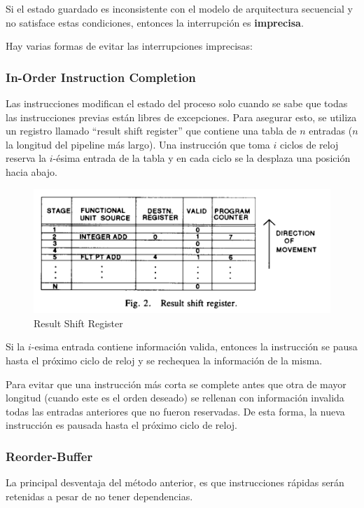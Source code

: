 Si el estado guardado es inconsistente con el modelo de arquitectura secuencial y no satisface estas condiciones, entonces la interrupción es \textbf{imprecisa}. 

Hay varias formas de evitar las interrupciones imprecisas:

\subsubsection{In-Order Instruction Completion}
Las instrucciones modifican el estado del proceso solo cuando se sabe que todas las instrucciones previas están libres de excepciones. Para asegurar esto, se utiliza un registro llamado ``result shift register'' que contiene una tabla de $n$  entradas ($n$ la longitud del pipeline más largo). Una instrucción que toma $i$ ciclos de reloj reserva la $i$-ésima entrada de la tabla y en cada ciclo se la desplaza una posición hacia abajo.
\begin{figure}[h]
	\centering
	\includegraphics[width=0.5\linewidth]{imagenes/shift_register}
	\caption{Result Shift Register}
	\label{fig:shiftregister}
\end{figure}

Si la $i$-esima entrada contiene información valida, entonces la instrucción se pausa hasta el próximo ciclo de reloj y se rechequea la información de la misma.

Para evitar que una instrucción más corta se complete antes que otra de mayor longitud (cuando este es el orden deseado) se rellenan con información invalida todas las entradas anteriores que no fueron reservadas. De esta forma, la nueva instrucción es pausada hasta el próximo ciclo de reloj.

%

\subsubsection{Reorder-Buffer}
La principal desventaja del método anterior, es que instrucciones rápidas serán retenidas a pesar de no tener dependencias.

